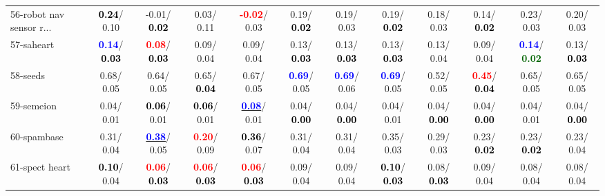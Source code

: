\begin{table}[h]
\begin{center}
{\begin{tabular}{lc|c|c|c|c|c|c|c|c|c|c}
56-robot nav sensor r... & \textcolor{black}{\textbf{  0.24}}/  0.10 &  -0.01/\textcolor{black}{\textbf{  0.02}} &   0.03/  0.11 & \textcolor{red}{\textbf{ -0.02}}/  0.03 &   0.19/\textcolor{black}{\textbf{  0.02}} &   0.19/  0.03 &   0.19/\textcolor{black}{\textbf{  0.02}} &   0.18/  0.03 &   0.14/\textcolor{black}{\textbf{  0.02}} &   0.23/  0.03 &   0.20/  0.03 \\
57-saheart & \textcolor{blue}{\textbf{  0.14}}/\textcolor{black}{\textbf{  0.03}} & \textcolor{red}{\textbf{  0.08}}/\textcolor{black}{\textbf{  0.03}} &   0.09/  0.04 &   0.09/  0.04 &   0.13/\textcolor{black}{\textbf{  0.03}} &   0.13/\textcolor{black}{\textbf{  0.03}} &   0.13/\textcolor{black}{\textbf{  0.03}} &   0.13/  0.04 &   0.09/  0.04 & \textcolor{blue}{\textbf{  0.14}}/\textcolor{darkgreen}{\textbf{  0.02}} &   0.13/\textcolor{black}{\textbf{  0.03}} \\
58-seeds &   0.68/  0.05 &   0.64/  0.05 &   0.65/\textcolor{black}{\textbf{  0.04}} &   0.67/  0.05 & \textcolor{blue}{\textbf{  0.69}}/  0.05 & \textcolor{blue}{\textbf{  0.69}}/  0.06 & \textcolor{blue}{\textbf{  0.69}}/  0.05 &   0.52/  0.05 & \textcolor{red}{\textbf{  0.45}}/\textcolor{black}{\textbf{  0.04}} &   0.65/  0.05 &   0.65/  0.05 \\
59-semeion &   0.04/  0.01 & \textcolor{black}{\textbf{  0.06}}/  0.01 & \textcolor{black}{\textbf{  0.06}}/  0.01 & \underline{\textcolor{blue}{\textbf{  0.08}}}/  0.01 &   0.04/\textcolor{black}{\textbf{  0.00}} &   0.04/\textcolor{black}{\textbf{  0.00}} &   0.04/  0.01 &   0.04/\textcolor{black}{\textbf{  0.00}} &   0.04/\textcolor{black}{\textbf{  0.00}} &   0.04/  0.01 &   0.04/\textcolor{black}{\textbf{  0.00}} \\
60-spambase &   0.31/  0.04 & \underline{\textcolor{blue}{\textbf{  0.38}}}/  0.05 & \textcolor{red}{\textbf{  0.20}}/  0.09 & \textcolor{black}{\textbf{  0.36}}/  0.07 &   0.31/  0.04 &   0.31/  0.04 &   0.35/  0.03 &   0.29/  0.03 &   0.23/\textcolor{black}{\textbf{  0.02}} &   0.23/\textcolor{black}{\textbf{  0.02}} &   0.23/  0.04 \\ \hline
61-spect heart & \textcolor{black}{\textbf{  0.10}}/  0.04 & \textcolor{red}{\textbf{  0.06}}/\textcolor{black}{\textbf{  0.03}} & \textcolor{red}{\textbf{  0.06}}/\textcolor{black}{\textbf{  0.03}} & \textcolor{red}{\textbf{  0.06}}/\textcolor{black}{\textbf{  0.03}} &   0.09/  0.04 &   0.09/  0.04 & \textcolor{black}{\textbf{  0.10}}/\textcolor{black}{\textbf{  0.03}} &   0.08/\textcolor{black}{\textbf{  0.03}} &   0.09/  0.04 &   0.08/  0.04 &   0.08/  0.04 \\

\end{tabular}}
\end{center}
\end{table}
